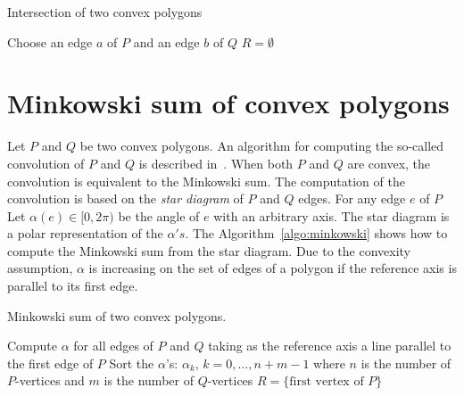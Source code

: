 \begin{algorithm}[tbph]
  \caption{Intersection of two convex polygons}
  \label{algo:intersection:convex:poly}
  Choose an edge $a$ of $P$ and an edge $b$ of $Q$\;
  $R=\emptyset$\;
\end{algorithm}

\section{Minkowski sum of convex polygons}
\label{sec:calcul:somme}

Let $P$ and $Q$ be two convex polygons. An algorithm for computing the
so-called convolution of $P$ and $Q$ is described in~\cite[Section
8.4]{ORourke:1998}. When both $P$ and $Q$ are convex, the convolution
is equivalent to the Minkowski sum. The computation of the convolution
is based on the \emph{star diagram} of $P$ and $Q$ edges. For any edge
$e$ of $P$ Let $\alpha(e)\in[0,2\pi)$ be the angle of $e$ with an
arbitrary axis. The star diagram is a polar representation of the
$\alpha's$. The Algorithm~\ref{algo:minkowski} shows how to compute
the Minkowski sum from the star diagram. Due to the convexity
assumption, $\alpha$ is increasing on the set of edges of a polygon if
the reference axis is parallel to its first edge.
\begin{algorithm}[tbph]
  \caption{Minkowski sum of two convex polygons.}
  \label{algo:minkowski}
  Compute $\alpha$ for all edges of $P$ and $Q$ taking as the
  reference axis a line parallel to the first edge of $P$\;
  Sort the $\alpha$'s: $\alpha_k$, $k=0,\ldots,n+m-1$ where $n$ is the
  number of $P$-vertices and $m$ is the number of $Q$-vertices\;
  $R=\{\text{first vertex of }P\}$\;
\end{algorithm}

